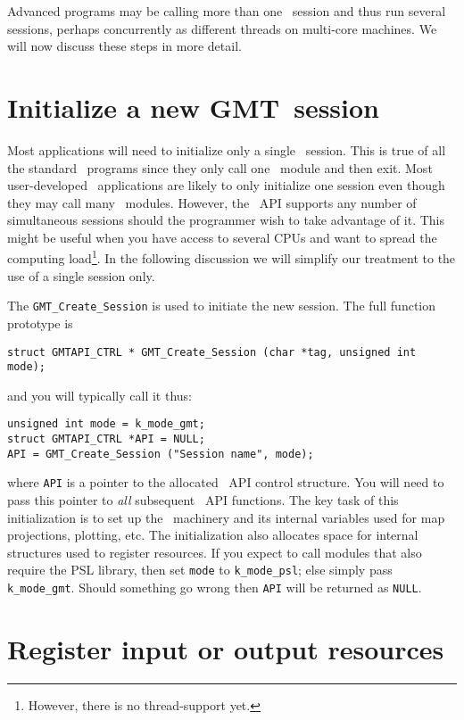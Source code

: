 \documentclass[11pt]{report}
\begin{document}
Advanced programs may be calling more than one \GMT\ session and thus run several
sessions, perhaps  concurrently as different threads on multi-core machines.
We will now discuss these steps in more detail.

\section{Initialize a new GMT\ session}

Most applications will need to initialize only a single \GMT\ session.  This is true of all
the standard \GMT\ programs since they only call one \GMT\ module and then exit.  Most
user-developed \GMT\ applications are likely to only initialize one session even though
they may call many \GMT\ modules.  However, the \GMT\ API supports any number of
simultaneous sessions should the programmer wish to take advantage of it.  This
might be useful when you have access to several CPUs and want to spread the computing load\footnote{However,
there is no thread-support yet.}.
In the following discussion we will simplify our treatment to the use
of a single session only.

The \texttt{GMT\_Create\_Session} is used to initiate the new session.  The full
function prototype is

\begin{verbatim}
struct GMTAPI_CTRL * GMT_Create_Session (char *tag, unsigned int mode);
\end{verbatim}
and you will typically call it thus:
\begin{verbatim}
unsigned int mode = k_mode_gmt;
struct GMTAPI_CTRL *API = NULL;
API = GMT_Create_Session ("Session name", mode);
\end{verbatim}
where \texttt{API} is a pointer to the allocated \GMT\ API control structure.  You will need to
pass this pointer to \emph{all} subsequent \GMT\ API functions.  The key task of this initialization
is to set up the \GMT\ machinery and its internal variables used for map projections, plotting,
etc.  The initialization also allocates space for internal structures used to register resources.
If you expect to call modules that also require the PSL library, then set \texttt{mode} to
\texttt{k\_mode\_psl}; else simply pass \texttt{k\_mode\_gmt}.  Should something go wrong then \texttt{API}
will be returned as \texttt{NULL}.

\section{Register input or output resources}
\end{document}
